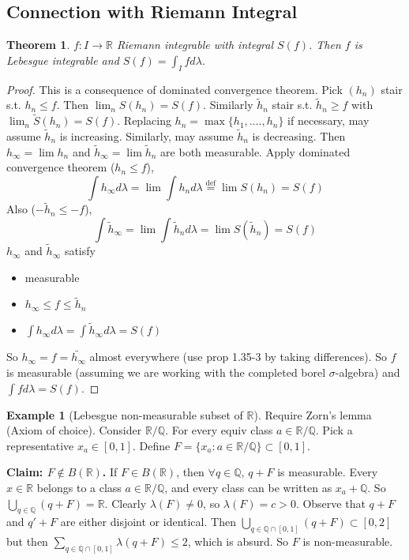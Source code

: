 \documentclass{article}
\theoremstyle{definition}
\newtheorem{example}[defn]{Example}
\theoremstyle{remark}
\theoremstyle{plain}
\newtheorem{thm}[defn]{Theorem}
\newcommand{\QQ}{\mathbb{Q}}
\newcommand{\RR}{\mathbb{R}}
\begin{document}
\subsection{Connection with Riemann Integral}
\begin{thm}
    $f:I\to\RR$ Riemann integrable with integral $S(f)$. Then $f$ is Lebesgue integrable and $S(f)=\int_Ifd\lambda$.
\end{thm}
\begin{proof}
    This is a consequence of dominated convergence theorem.
    Pick $(h_n)$ stair s.t. $h_n\le f$. Then $\lim_n S(h_n)=S(f)$. Similarly $\tilde{h}_n$ stair s.t. $\tilde h_n\ge f$ with $\lim_n\tilde S(h_n)=S(f)$. Replacing $h_n=\max\{h_1,....,h_n\}$ if necessary, may assume $\tilde h_n$ is increasing. Similarly, may assume $\tilde h_n$ is decreasing. Then $h_\infty=\lim h_n$ and $\tilde h_\infty=\lim \tilde h_n$ are both measurable. Apply dominated convergence theorem ($h_n\le f$),
    \[\int h_\infty d\lambda=\lim\int h_nd\lambda\overset{\text{def}}{=}\lim S(h_n)=S(f)\]
    Also ($-\tilde h_n\le -f$),
    \[\int \tilde h_\infty=\lim\int\tilde h_nd\lambda=\lim S(\tilde h_n)=S(f)\]
    $h_\infty$ and $\tilde h_\infty$ satisfy
    \begin{itemize}
        \item measurable
        \item $h_\infty\le f\le\tilde h_n$
        \item $\int h_\infty d\lambda=\int\tilde h_\infty d\lambda=S(f)$
    \end{itemize}
    So $h_\infty=f=\tilde{h_\infty}$ almost everywhere (use prop 1.35-3 by taking differences). So $f$ is measurable (assuming we are working with the completed borel $\sigma$-algebra) and $\int fd\lambda=S(f)$.
\end{proof}
\begin{example}[Lebesgue non-measurable subset of $\RR$]
Require Zorn's lemma (Axiom of choice). Consider $\RR/\QQ$. For every equiv class $a\in\RR/\QQ$. Pick a representative $x_a\in[0,1]$. Define $F=\{x_a:a\in\RR/\QQ\}\subset[0,1]$.

\textbf{Claim: $F\not\in B(\RR)$.} If $F\in B(\RR)$, then $\forall q\in\QQ$, $q+F$ is measurable. Every $x\in \RR$ belongs to a class $a\in\RR/\QQ$, and every class can be written as $x_a+\QQ$. So $\bigcup_{q\in\QQ}(q+F)=\RR$. Clearly $\lambda(F)\neq 0$, so $\lambda(F)=c>0$. Observe that $q+F$ and $q'+F$ are either disjoint or identical. Then $\bigcup_{q\in\QQ\cap[0,1]}(q+F)\subset[0,2]$ but then $\sum_{q\in\QQ\cap[0,1]}\lambda(q+F)\le 2$, which is absurd. So $F$ is non-measurable.
\end{example}
\end{document}

